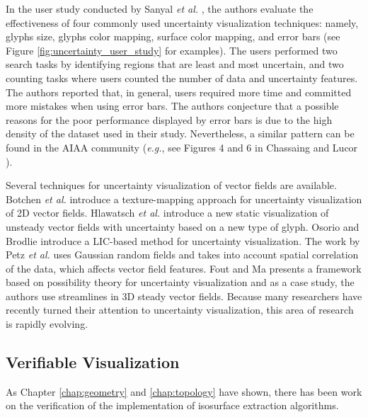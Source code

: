 In the user study conducted by Sanyal \emph{et al.} \cite{Sanyal:2009:USC:1638611.1639227},  the authors evaluate the effectiveness of four commonly used uncertainty visualization techniques: namely, glyphs size, glyphs color mapping, surface color mapping, and error bars (see Figure \ref{fig:uncertainty_user_study} for examples). The users performed two search tasks by identifying regions that are least and most uncertain, and two counting tasks where users counted the number of data and uncertainty features. The authors reported that, in general,  users required more time and committed more mistakes when using error bars. The authors conjecture that a possible reasons for the poor performance displayed by error bars is due to the high density of the dataset used in their study. Nevertheless, a similar pattern can be found in the AIAA community (\emph{e.g.}, see Figures 4 and 6 in Chassaing and Lucor \cite{Chassaing:2010:SIF:27267063}). 

Several techniques for uncertainty visualization of vector fields are available. Botchen \emph{et al.} \cite{10.1109/VIS.2005.97} introduce a texture-mapping approach  for uncertainty visualization of 2D vector fields. Hlawatsch \emph{et al.} \cite{hlawatsch:2011:FRGU} introduce a new static visualization of unsteady vector fields with uncertainty based on a new type of glyph. Osorio and Brodlie \cite{allendes2009uncertain} introduce a LIC-based method for uncertainty visualization. The work by Petz \emph{et al.} \cite{CGF:CGF3097} uses Gaussian random fields and takes into account spatial correlation of the data, which affects vector field features. Fout and Ma \cite{Fout2012} presents a framework based on possibility theory for uncertainty visualization and as a case study, the authors use streamlines in 3D steady vector fields.  Because many researchers have recently turned their attention to uncertainty visualization, this area of research is rapidly evolving.

\subsection{Verifiable Visualization}

As Chapter \ref{chap:geometry} and \ref{chap:topology} have shown, there has been work on
the verification of the implementation of isosurface extraction algorithms.

